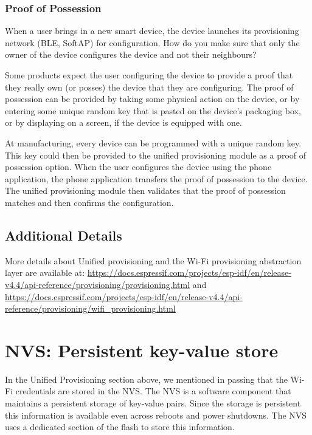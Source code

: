 \documentclass[main.tex]{subfiles}
\begin{document}
\subsubsection{Proof of Possession}

When a user brings in a new smart device, the device launches its provisioning network (BLE, SoftAP) for configuration.  How do you make sure that only the owner of the device configures the device and not their neighbours?

Some products expect the user configuring the device to provide a proof that they really own (or posses) the device that they are configuring. The proof of possession can be provided by taking some physical action on the device, or by entering some unique random key that is pasted on the device's packaging box, or by displaying on a screen, if the device is equipped with one.

At manufacturing, every device can be programmed with a unique random key. This key could then be provided to the unified provisioning module as a proof of possession option. When the user configures the device using the phone application, the phone application transfers the proof of possession to the device. The unified provisioning module then validates that the proof of possession matches and then confirms the configuration.

\subsection{Additional Details}

More details about Unified provisioning and the Wi-Fi provisioning abstraction layer are available at: \url{https://docs.espressif.com/projects/esp-idf/en/release-v4.4/api-reference/provisioning/provisioning.html} and \url{https://docs.espressif.com/projects/esp-idf/en/release-v4.4/api-reference/provisioning/wifi_provisioning.html}

\section{NVS: Persistent key-value store}\label{sec:nvs_info}
In the Unified Provisioning section above, we mentioned in passing that the Wi-Fi credentials are stored in the NVS. The NVS is a software component that maintains a persistent storage of key-value pairs. Since the storage is persistent this information is available even across reboots and power shutdowns. The NVS uses a dedicated section of the flash to store this information.
\end{document}
